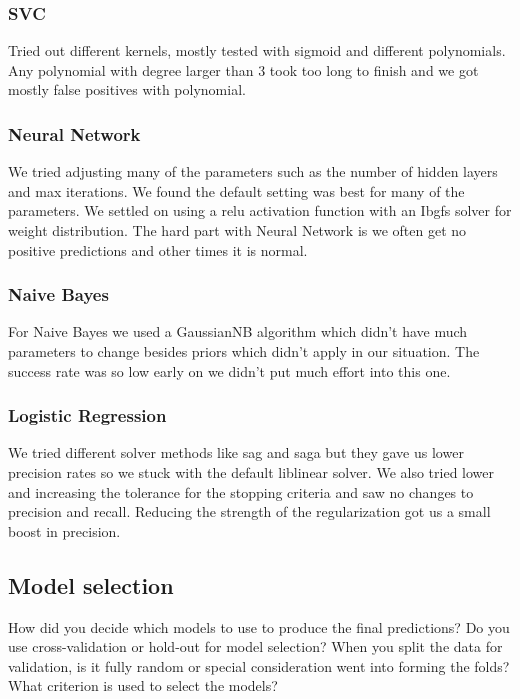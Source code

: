 \documentclass[11pt,a4paper]{article}
\begin{document}
		\subsubsection{SVC}
			Tried out different kernels, mostly tested with sigmoid and different polynomials.
			Any polynomial with degree larger than 3 took too long to finish and we got mostly false positives with polynomial.

		\subsubsection{Neural Network}
			We tried adjusting many of the parameters such as the number of hidden layers and max iterations.
			We found the default setting was best for many of the parameters.
			We settled on using a relu activation function with an Ibgfs solver for weight distribution.
			The hard part with Neural Network is we often get no positive predictions and other times it is normal.

		\subsubsection{Naive Bayes}
			For Naive Bayes we used a GaussianNB algorithm which didn't have much parameters to change besides priors which didn't apply in our situation.
			The success rate was so low early on we didn't put much effort into this one.

		\subsubsection{Logistic Regression}
			We tried different solver methods like sag and saga but they gave us lower precision rates so we stuck with the default liblinear solver.
			We also tried lower and increasing the tolerance for the stopping criteria and saw no changes to precision and recall.
			Reducing the strength of the regularization got us a small boost in precision.

	\subsection{Model selection}
		How did you decide which models to use to produce the final predictions? 
		Do you use cross-validation or hold-out for model selection?
		When you split the data for validation, is it fully random or special consideration went into forming the folds?
		What criterion is used to select the models?
\end{document}
